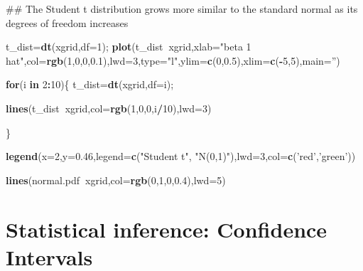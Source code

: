 \documentclass[12pt,]{book}
\newenvironment{Shaded}{\begin{snugshade}}{\end{snugshade}}
\newcommand{\KeywordTok}[1]{\textcolor[rgb]{0.13,0.29,0.53}{\textbf{#1}}}
\newcommand{\DataTypeTok}[1]{\textcolor[rgb]{0.13,0.29,0.53}{#1}}
\newcommand{\DecValTok}[1]{\textcolor[rgb]{0.00,0.00,0.81}{#1}}
\newcommand{\FloatTok}[1]{\textcolor[rgb]{0.00,0.00,0.81}{#1}}
\newcommand{\StringTok}[1]{\textcolor[rgb]{0.31,0.60,0.02}{#1}}
\newcommand{\ControlFlowTok}[1]{\textcolor[rgb]{0.13,0.29,0.53}{\textbf{#1}}}
\newcommand{\OperatorTok}[1]{\textcolor[rgb]{0.81,0.36,0.00}{\textbf{#1}}}
\newcommand{\NormalTok}[1]{#1}
\begin{document}
\begin{Shaded}
\begin{Highlighting}[]
\NormalTok{## The Student t distribution grows more similar to the standard normal as its degrees of freedom increases }

\NormalTok{t_dist=}\KeywordTok{dt}\NormalTok{(xgrid,}\DataTypeTok{df=}\DecValTok{1}\NormalTok{);}
\KeywordTok{plot}\NormalTok{(t_dist}\OperatorTok{~}\NormalTok{xgrid,}\DataTypeTok{xlab=}\StringTok{"beta 1 hat"}\NormalTok{,}\DataTypeTok{col=}\KeywordTok{rgb}\NormalTok{(}\DecValTok{1}\NormalTok{,}\DecValTok{0}\NormalTok{,}\DecValTok{0}\NormalTok{,}\FloatTok{0.1}\NormalTok{),}\DataTypeTok{lwd=}\DecValTok{3}\NormalTok{,}\DataTypeTok{type=}\StringTok{"l"}\NormalTok{,}\DataTypeTok{ylim=}\KeywordTok{c}\NormalTok{(}\DecValTok{0}\NormalTok{,}\FloatTok{0.5}\NormalTok{),}\DataTypeTok{xlim=}\KeywordTok{c}\NormalTok{(}\OperatorTok{-}\DecValTok{5}\NormalTok{,}\DecValTok{5}\NormalTok{),}\DataTypeTok{main=}\StringTok{''}\NormalTok{)}

\ControlFlowTok{for}\NormalTok{(i }\ControlFlowTok{in} \DecValTok{2}\OperatorTok{:}\DecValTok{10}\NormalTok{)\{}
\NormalTok{t_dist=}\KeywordTok{dt}\NormalTok{(xgrid,}\DataTypeTok{df=}\NormalTok{i);}

\KeywordTok{lines}\NormalTok{(t_dist}\OperatorTok{~}\NormalTok{xgrid,}\DataTypeTok{col=}\KeywordTok{rgb}\NormalTok{(}\DecValTok{1}\NormalTok{,}\DecValTok{0}\NormalTok{,}\DecValTok{0}\NormalTok{,i}\OperatorTok{/}\DecValTok{10}\NormalTok{),}\DataTypeTok{lwd=}\DecValTok{3}\NormalTok{)}

\NormalTok{\}}

\KeywordTok{legend}\NormalTok{(}\DataTypeTok{x=}\DecValTok{2}\NormalTok{,}\DataTypeTok{y=}\FloatTok{0.46}\NormalTok{,}\DataTypeTok{legend=}\KeywordTok{c}\NormalTok{(}\StringTok{"Student t"}\NormalTok{, }\StringTok{"N(0,1)"}\NormalTok{),}\DataTypeTok{lwd=}\DecValTok{3}\NormalTok{,}\DataTypeTok{col=}\KeywordTok{c}\NormalTok{(}\StringTok{'red'}\NormalTok{,}\StringTok{'green'}\NormalTok{))}

\KeywordTok{lines}\NormalTok{(normal.pdf}\OperatorTok{~}\NormalTok{xgrid,}\DataTypeTok{col=}\KeywordTok{rgb}\NormalTok{(}\DecValTok{0}\NormalTok{,}\DecValTok{1}\NormalTok{,}\DecValTok{0}\NormalTok{,}\FloatTok{0.4}\NormalTok{),}\DataTypeTok{lwd=}\DecValTok{5}\NormalTok{)}
\end{Highlighting}
\end{Shaded}

\chapter{Statistical inference: Confidence Intervals}\label{ch:CI}
\end{document}
